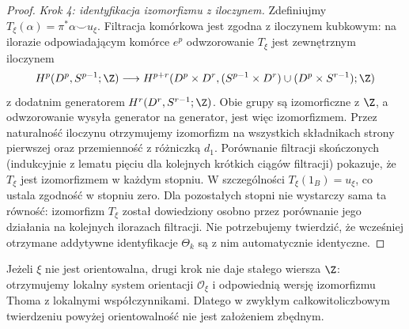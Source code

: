 \begin{proof}
\emph{Krok 4: identyfikacja izomorfizmu z iloczynem.}
Zdefiniujmy $T_\xi(\alpha)=\pi^*\alpha\smile u_\xi$.
Filtracja komórkowa jest zgodna z iloczynem kubkowym:
na ilorazie odpowiadającym komórce $e^p$ odwzorowanie
$T_\xi$ jest zewnętrznym iloczynem
\[
H^p(D^p,S^{p-1};\Z)\longrightarrow
H^{p+r}(D^p\times D^r,
 (S^{p-1}\times D^r)\cup(D^p\times S^{r-1});\Z)
\]
z dodatnim generatorem $H^r(D^r,S^{r-1};\Z)$.
Obie grupy są izomorficzne z $\Z$, a odwzorowanie wysyła
generator na generator, jest więc izomorfizmem.
Przez naturalność iloczynu otrzymujemy izomorfizm
na wszystkich składnikach strony pierwszej oraz
przemienność z różniczką $d_1$.
Porównanie filtracji skończonych (indukcyjnie z lematu
pięciu dla kolejnych krótkich ciągów filtracji)
pokazuje, że $T_\xi$ jest izomorfizmem w każdym stopniu.
W szczególności $T_\xi(1_B)=u_\xi$, co ustala zgodność
w stopniu zero. Dla pozostałych stopni nie wystarczy
sama ta równość: izomorfizm $T_\xi$ został dowiedziony
osobno przez porównanie jego działania na kolejnych
ilorazach filtracji. Nie potrzebujemy twierdzić, że
wcześniej otrzymane addytywne identyfikacje $\Theta_k$
są z nim automatycznie identyczne.
\end{proof}
\begin{uwaga}
Jeżeli $\xi$ nie jest orientowalna, drugi krok nie daje
stałego wiersza $\Z$: otrzymujemy lokalny system orientacji
$\mathcal O_\xi$ i odpowiednią wersję izomorfizmu Thoma
z lokalnymi współczynnikami. Dlatego w zwykłym
całkowitoliczbowym twierdzeniu powyżej orientowalność
nie jest założeniem zbędnym.
\end{uwaga}


